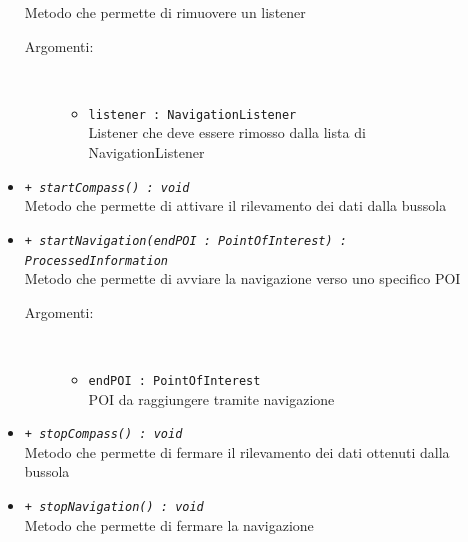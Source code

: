 \documentclass[../DefinizioneDiProdotto.tex]{subfiles}
\begin{document}
\begin{description}
\begin{itemize}
		Metodo che permette di rimuovere un listener
		\begin{description}
			\item[Argomenti:] \
			\begin{itemize}
				\item \texttt{listener : NavigationListener}\\
				Listener che deve essere rimosso dalla lista di NavigationListener\end{itemize}
		\end{description}
		\item \texttt{+ \textit{startCompass() : void}}\\
		Metodo che permette di attivare il rilevamento dei dati dalla bussola
		\item \texttt{+ \textit{startNavigation(endPOI : PointOfInterest) : ProcessedInformation}}\\
		Metodo che permette di avviare la navigazione verso uno specifico POI
		\begin{description}
			\item[Argomenti:] \
			\begin{itemize}
				\item \texttt{endPOI : PointOfInterest}\\
				POI da raggiungere tramite navigazione\end{itemize}
		\end{description}
		\item \texttt{+ \textit{stopCompass() : void}}\\
		Metodo che permette di fermare il rilevamento dei dati ottenuti dalla bussola
		\item \texttt{+ \textit{stopNavigation() : void}}\\
		Metodo che permette di fermare la navigazione
	\end{itemize}
\end{description}
\end{document}
